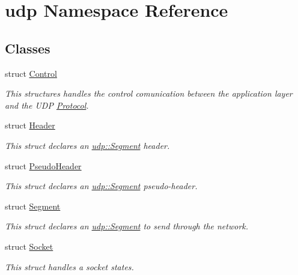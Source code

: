 \hypertarget{namespaceudp}{}\section{udp Namespace Reference}
\label{namespaceudp}
\subsection*{Classes}
\begin{DoxyCompactItemize}
\item 
struct \hyperlink{structudp_1_1Control}{Control}
\begin{DoxyCompactList}\small\item\em This structures handles the control comunication between the application layer and the U\+DP \hyperlink{classProtocol}{Protocol}. \end{DoxyCompactList}\item 
struct \hyperlink{structudp_1_1Header}{Header}
\begin{DoxyCompactList}\small\item\em This struct declares an \hyperlink{structudp_1_1Segment}{udp\+::\+Segment} header. \end{DoxyCompactList}\item 
struct \hyperlink{structudp_1_1PseudoHeader}{Pseudo\+Header}
\begin{DoxyCompactList}\small\item\em This struct declares an \hyperlink{structudp_1_1Segment}{udp\+::\+Segment} pseudo-\/header. \end{DoxyCompactList}\item 
struct \hyperlink{structudp_1_1Segment}{Segment}
\begin{DoxyCompactList}\small\item\em This struct declares an \hyperlink{structudp_1_1Segment}{udp\+::\+Segment} to send through the network. \end{DoxyCompactList}\item 
struct \hyperlink{structudp_1_1Socket}{Socket}
\begin{DoxyCompactList}\small\item\em This struct handles a socket states. \end{DoxyCompactList}\end{DoxyCompactItemize}
